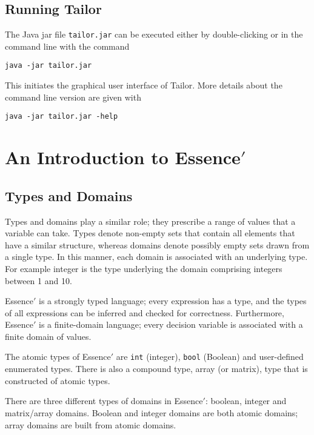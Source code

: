 \documentclass{article}
\begin{document}
\subsection{Running {\sc Tailor}}
The Java jar file {\tt tailor.jar} can be executed either 
by double-clicking or in the command line with the command
\begin{center}
{\tt java -jar tailor.jar}
\end{center}
This initiates the graphical user interface of {\sc Tailor}. 
More details about the command line version are given with 
\begin{center}
{\tt java -jar tailor.jar -help}
\end{center}

\section{An Introduction to {\sc Essence}$'$}


\subsection{Types and Domains}

Types and domains play a similar role; they prescribe a range of
values that a variable can take.
Types denote non-empty
sets that contain all elements
that have a similar structure, 
whereas domains denote possibly  empty
sets drawn from a
single type.  In this manner, each domain is associated with an
underlying type.  For example integer is the type underlying the
domain comprising integers between 1 and 10.

{\sc Essence}$'$ is a strongly typed language;
every expression
has a type, and the types of all
expressions can be inferred and checked for correctness.
Furthermore, {\sc Essence}$'$ is a finite-domain language; every decision variable is
associated with a finite domain of values. 


The 
atomic types of {\sc Essence}$'$ are {\tt int} (integer), {\tt bool} (Boolean) and
 user-defined enumerated types. There is also a compound type, array (or matrix),
 type that is constructed of atomic types.


There are three different types of domains in {\sc Essence}$'$:
boolean, integer and matrix/array domains. Boolean and integer 
domains are both atomic domains; array domains are built from 
atomic domains.
\end{document}
